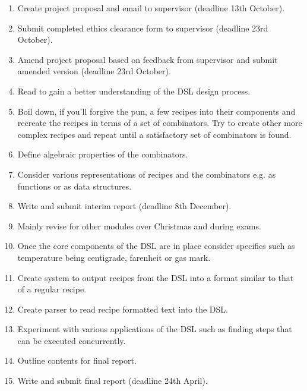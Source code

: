 \documentclass[12pt]{article}
\begin{document}
    \begin{enumerate}

        \item Create project proposal and email to supervisor
        (deadline 13th October).

        \item Submit completed ethics clearance form to supervisor
        (deadline 23rd October).

        \item Amend project proposal based on feedback from
        supervisor and submit amended version (deadline 23rd October).

        \item Read \cite{hudak, contracts, pretty} to gain a better
        understanding of the DSL design process.

        \item Boil down, if you'll forgive the pun, a few recipes
        into their components and recreate the recipes in terms
        of a set of combinators. Try to create other more complex
        recipes and repeat until a satisfactory set of combinators
        is found.

        \item Define algebraic properties of the combinators.

        \item Consider various representations of recipes and the
        combinators e.g. as functions or as data structures.

        \item Write and submit interim report (deadline 8th December).

        \item Mainly revise for other modules over Christmas and during
        exams.

        \item Once the core components of the DSL are in place
        consider specifics such as temperature being centigrade,
        farenheit or gas mark.

        \item Create system to output recipes from the DSL into a format
        similar to that of a regular recipe.

        \item Create parser to read recipe formatted text into the DSL.

        \item Experiment with various applications of the DSL such
        as finding steps that can be executed concurrently.

        \item Outline contents for final report.

        \item Write and submit final report (deadline 24th April).

    \end{enumerate}
\end{document}
